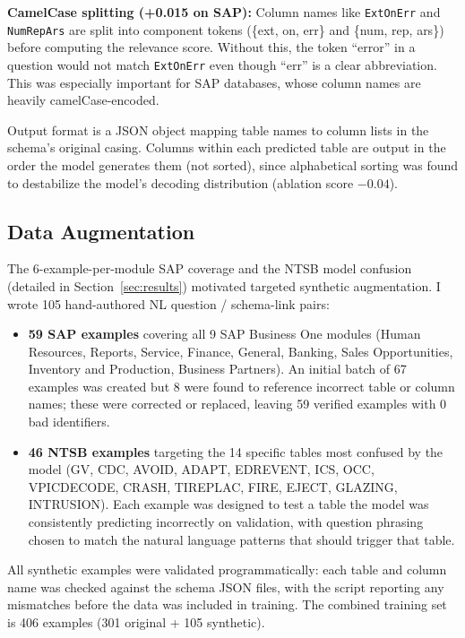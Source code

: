 \documentclass[10pt,twocolumn]{article}
\begin{document}
\textbf{CamelCase splitting (+0.015 on SAP):} Column names like \texttt{ExtOnErr} and \texttt{NumRepArs} are split into component tokens (\{ext, on, err\} and \{num, rep, ars\}) before computing the relevance score. Without this, the token ``error'' in a question would not match \texttt{ExtOnErr} even though ``err'' is a clear abbreviation. This was especially important for SAP databases, whose column names are heavily camelCase-encoded.

Output format is a JSON object mapping table names to column lists in the schema's original casing. Columns within each predicted table are output in the order the model generates them (not sorted), since alphabetical sorting was found to destabilize the model's decoding distribution (ablation score $-0.04$).

\subsection*{Data Augmentation}
The 6-example-per-module SAP coverage and the NTSB model confusion (detailed in Section~\ref{sec:results}) motivated targeted synthetic augmentation. I wrote 105 hand-authored NL question / schema-link pairs:

\begin{itemize}[noitemsep,topsep=2pt]
  \item \textbf{59 SAP examples} covering all 9 SAP Business One modules (Human Resources, Reports, Service, Finance, General, Banking, Sales Opportunities, Inventory and Production, Business Partners). An initial batch of 67 examples was created but 8 were found to reference incorrect table or column names; these were corrected or replaced, leaving 59 verified examples with 0 bad identifiers.
  \item \textbf{46 NTSB examples} targeting the 14 specific tables most confused by the model (GV, CDC, AVOID, ADAPT, EDREVENT, ICS, OCC, VPICDECODE, CRASH, TIREPLAC, FIRE, EJECT, GLAZING, INTRUSION). Each example was designed to test a table the model was consistently predicting incorrectly on validation, with question phrasing chosen to match the natural language patterns that should trigger that table.
\end{itemize}

All synthetic examples were validated programmatically: each table and column name was checked against the schema JSON files, with the script reporting any mismatches before the data was included in training. The combined training set is 406 examples (301 original + 105 synthetic).
\end{document}

